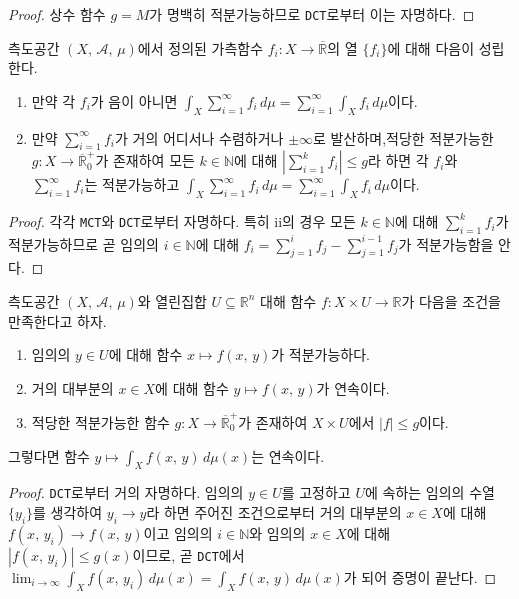 \begin{proof}
    상수 함수 $g=M$가 명백히 적분가능하므로 \texttt{DCT}로부터 이는 자명하다.
\end{proof}

\begin{corollary}
    측도공간 $(X,\,\mathcal{A},\,\mu)$에서 정의된 가측함수 $f_i:X\to\overline{\mathbb{R}}$의 열 $\{f_i\}$에 대해 다음이 성립한다.
    \begin{enumerate}
        \item 만약 각 $f_i$가 음이 아니면 $\int_X\sum_{i=1}^\infty f_i\,d\mu=\sum_{i=1}^\infty\int_Xf_i\,d\mu$이다.
        \item 만약 $\sum_{i=1}^\infty f_i$가 거의 어디서나 수렴하거나 $\pm\infty$로 발산하며,\footnotemark 적당한 적분가능한 $g:X\to\overline{\mathbb{R}}^+_0$가 존재하여 모든 $k\in\mathbb{N}$에 대해 $|\sum_{i=1}^kf_i|\leq g$라 하면 각 $f_i$와 $\sum_{i=1}^\infty f_i$는 적분가능하고 $\int_X\sum_{i=1}^\infty f_i\,d\mu=\sum_{i=1}^\infty\int_Xf_i\,d\mu$이다.
    \end{enumerate}
\end{corollary}

\begin{proof}
    각각 \texttt{MCT}와 \texttt{DCT}로부터 자명하다. 특히 ii의 경우 모든 $k\in\mathbb{N}$에 대해 $\sum_{i=1}^kf_i$가 적분가능하므로 곧 임의의 $i\in\mathbb{N}$에 대해 $f_i=\sum_{j=1}^if_j-\sum_{j=1}^{i-1}f_j$가 적분가능함을 안다.
\end{proof}

\begin{corollary}\label{cor:integralContinuous}
    측도공간 $(X,\,\mathcal{A},\,\mu)$와 열린집합 $U\subseteq\mathbb{R}^n$ 대해 함수 $f:X\times U\to\mathbb{R}$가 다음을 조건을 만족한다고 하자.
    \begin{enumerate}
        \item 임의의 $y\in U$에 대해 함수 $x\mapsto f(x,\,y)$가 적분가능하다.
        \item 거의 대부분의 $x\in X$에 대해 함수 $y\mapsto f(x,\,y)$가 연속이다.
        \item 적당한 적분가능한 함수 $g:X\to\overline{\mathbb{R}}^+_0$가 존재하여 $X\times U$에서 $|f|\leq g$이다.
    \end{enumerate}
    그렇다면 함수 $y\mapsto\int_Xf(x,\,y)\,d\mu(x)$는 연속이다.
\end{corollary}

\begin{proof}
    \texttt{DCT}로부터 거의 자명하다. 임의의 $y\in U$를 고정하고 $U$에 속하는 임의의 수열 $\{y_i\}$를 생각하여 $y_i\to y$라 하면 주어진 조건으로부터 거의 대부분의 $x\in X$에 대해 $f(x,\,y_i)\to f(x,\,y)$이고 임의의 $i\in\mathbb{N}$와 임의의 $x\in X$에 대해 $|f(x,\,y_i)|\leq g(x)$이므로, 곧 \texttt{DCT}에서 $\lim_{i\to\infty}\int_Xf(x,\,y_i)\,d\mu(x)=\int_Xf(x,\,y)\,d\mu(x)$가 되어 증명이 끝난다.
\end{proof}

